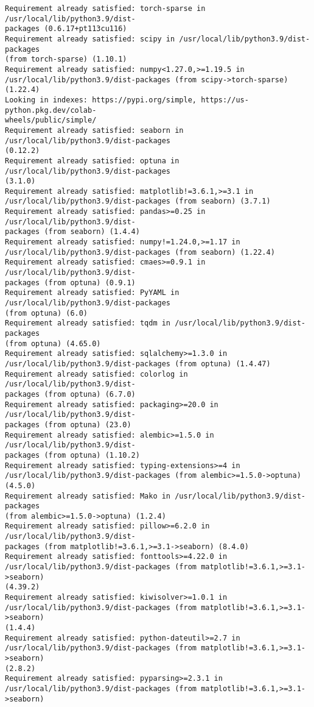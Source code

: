 \documentclass[11pt]{article}
\begin{document}
\begin{Verbatim}[commandchars=\\\{\}]
Requirement already satisfied: torch-sparse in /usr/local/lib/python3.9/dist-
packages (0.6.17+pt113cu116)
Requirement already satisfied: scipy in /usr/local/lib/python3.9/dist-packages
(from torch-sparse) (1.10.1)
Requirement already satisfied: numpy<1.27.0,>=1.19.5 in
/usr/local/lib/python3.9/dist-packages (from scipy->torch-sparse) (1.22.4)
Looking in indexes: https://pypi.org/simple, https://us-python.pkg.dev/colab-
wheels/public/simple/
Requirement already satisfied: seaborn in /usr/local/lib/python3.9/dist-packages
(0.12.2)
Requirement already satisfied: optuna in /usr/local/lib/python3.9/dist-packages
(3.1.0)
Requirement already satisfied: matplotlib!=3.6.1,>=3.1 in
/usr/local/lib/python3.9/dist-packages (from seaborn) (3.7.1)
Requirement already satisfied: pandas>=0.25 in /usr/local/lib/python3.9/dist-
packages (from seaborn) (1.4.4)
Requirement already satisfied: numpy!=1.24.0,>=1.17 in
/usr/local/lib/python3.9/dist-packages (from seaborn) (1.22.4)
Requirement already satisfied: cmaes>=0.9.1 in /usr/local/lib/python3.9/dist-
packages (from optuna) (0.9.1)
Requirement already satisfied: PyYAML in /usr/local/lib/python3.9/dist-packages
(from optuna) (6.0)
Requirement already satisfied: tqdm in /usr/local/lib/python3.9/dist-packages
(from optuna) (4.65.0)
Requirement already satisfied: sqlalchemy>=1.3.0 in
/usr/local/lib/python3.9/dist-packages (from optuna) (1.4.47)
Requirement already satisfied: colorlog in /usr/local/lib/python3.9/dist-
packages (from optuna) (6.7.0)
Requirement already satisfied: packaging>=20.0 in /usr/local/lib/python3.9/dist-
packages (from optuna) (23.0)
Requirement already satisfied: alembic>=1.5.0 in /usr/local/lib/python3.9/dist-
packages (from optuna) (1.10.2)
Requirement already satisfied: typing-extensions>=4 in
/usr/local/lib/python3.9/dist-packages (from alembic>=1.5.0->optuna) (4.5.0)
Requirement already satisfied: Mako in /usr/local/lib/python3.9/dist-packages
(from alembic>=1.5.0->optuna) (1.2.4)
Requirement already satisfied: pillow>=6.2.0 in /usr/local/lib/python3.9/dist-
packages (from matplotlib!=3.6.1,>=3.1->seaborn) (8.4.0)
Requirement already satisfied: fonttools>=4.22.0 in
/usr/local/lib/python3.9/dist-packages (from matplotlib!=3.6.1,>=3.1->seaborn)
(4.39.2)
Requirement already satisfied: kiwisolver>=1.0.1 in
/usr/local/lib/python3.9/dist-packages (from matplotlib!=3.6.1,>=3.1->seaborn)
(1.4.4)
Requirement already satisfied: python-dateutil>=2.7 in
/usr/local/lib/python3.9/dist-packages (from matplotlib!=3.6.1,>=3.1->seaborn)
(2.8.2)
Requirement already satisfied: pyparsing>=2.3.1 in
/usr/local/lib/python3.9/dist-packages (from matplotlib!=3.6.1,>=3.1->seaborn)

\end{Verbatim}
\end{document}
